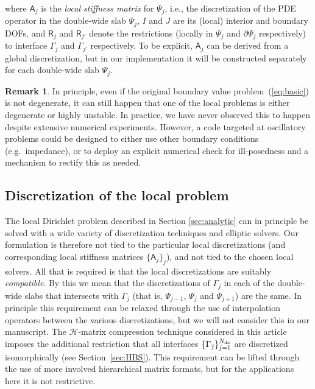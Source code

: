 \documentclass[final,onefignum,onetabnum]{siamart250211}
\newcommand{\mtx}[1]{\bm{\mathsf{#1}}}
\theoremstyle{definition}
\newtheorem{remark}{Remark}
\begin{document}
where $\mtx{A}_j$ is the \textit{local stiffness matrix} for $\Psi_j$, i.e., the discretization of the PDE operator in the double-wide slab $\Psi_j$, $I$ and $J$ are its (local) interior and boundary DOFs, and $\mtx{R}_j$ and $\mtx{R}_{j'}$ denote the restrictions (locally in $\Psi_j$ and $\partial\Psi_j$ respectively) to interface $\Gamma_j$ and $\Gamma_{j'}$ respectively. To be explicit, $\mtx{A}_j$ can be derived from a global discretization, but in our implementation it will be constructed separately for each double-wide slab $\Psi_j$.
\begin{remark}
In principle, even if the original boundary value problem~(\ref{eq:basic}) is not degenerate, it can still happen that one of the local problems is either degenerate or highly unstable. In practice, we have never observed this to happen despite extensive numerical experiments. However, a code targeted at oscillatory problems could be designed to either use other boundary conditions (e.g.~impedance), or to deploy an explicit numerical check for ill-posedness and a mechanism to rectify this as needed.
\end{remark}

\subsection{Discretization of the local problem}
\label{sec:HPS}
The local Dirichlet problem described in Section \ref{sec:analytic} can in
principle be solved with a wide variety of discretization techniques and elliptic
solvers. Our formulation is therefore not tied to the particular local discretizations (and corresponding local stiffness matrices $\{\mtx{A}_j\}_j$), and not tied to the chosen local solvers. All that is required is that the local discretizations are suitably \textit{compatible}. By this we mean that the discretizations of $\Gamma_j$ in each of the double-wide slabs that intersects with $\Gamma_j$ (that is, $\Psi_{j-1}$, $\Psi_{j}$ and $\Psi_{j+1}$) are the same. In principle this requirement can be relaxed through the use of interpolation operators between the various discretizations, but we will not consider this in our manuscript. The $\mathcal{H}$-matrix compression technique considered in this article imposes the additional restriction that all interfaces $\{\Gamma_j\}_{j=1}^{N_{\rm ds}}$ are discretized isomorphically (see Section~\ref{sec:HBS}). This requirement can be lifted through the use of more involved hierarchical matrix formats, but for the applications here it is not restrictive.
\end{document}
